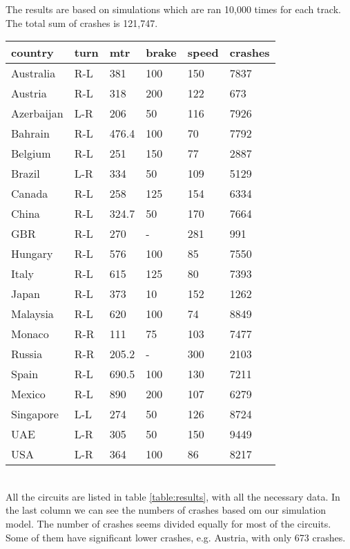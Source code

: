 The results are based on simulations which are ran 10,000 times for each track. The total sum of crashes is 121,747.\\

\noindent
\begin{tabularx}{.50\textwidth}{Xlllll}
country    & turn &mtr&brake  &speed &crashes\\
\hline
Australia  & R-L       & 381    &100    &150   &7837\\
Austria    & R-L       & 318    &200    &122   &673\\
Azerbaijan & L-R       & 206    &50     &116   &7926\\
Bahrain    & R-L       & 476.4  &100    &70    &7792\\
Belgium    & R-L       & 251    &150    &77    &2887\\
Brazil     & L-R       & 334    &50     &109   &5129\\
Canada     & R-L       & 258    &125    &154   &6334\\
China      & R-L       & 324.7  &50     &170   &7664\\
GBR        & R-L       & 270    &-      &281   &991\\
Hungary    & R-L       & 576    &100    &85    &7550\\
Italy      & R-L       & 615    &125    &80    &7393\\
Japan      & R-L       & 373    &10     &152   &1262\\
Malaysia   & R-L       & 620    &100    &74    &8849\\
Monaco     & R-R       & 111    &75     &103   &7477\\
Russia     & R-R       & 205.2  &-      &300   &2103\\
Spain      & R-L       & 690.5  &100    &130   &7211\\
Mexico     & R-L       & 890    &200    &107   &6279\\
Singapore  & L-L       & 274    &50     &126   &8724\\
UAE        & L-R       & 305    &50     &150   &9449\\
USA        & L-R       & 364    &100    &86    &8217\\
\end{tabularx}
\label{table:results}\\

All the circuits are listed in table \ref{table:results}, with all the necessary data. In the last column we can see the numbers of crashes based om our simulation model. The number of crashes seems divided equally for most of the circuits. Some of them have significant lower crashes, e.g. Austria, with only 673 crashes.

